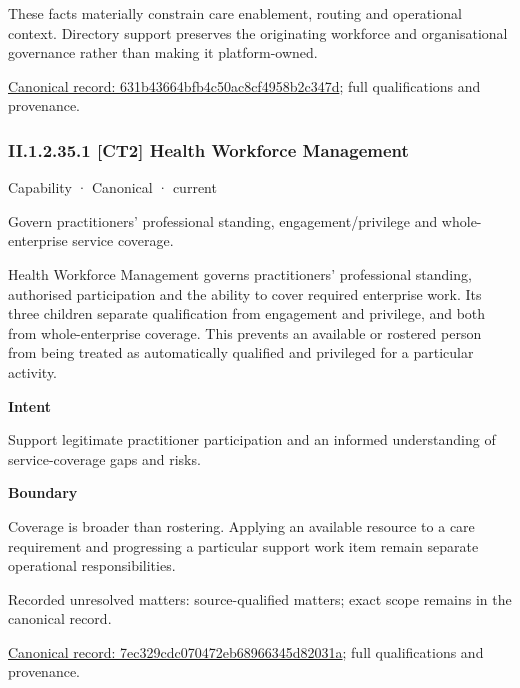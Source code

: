 These facts materially constrain care enablement, routing and operational context. Directory support preserves the originating workforce and organisational governance rather than making it platform-owned.


{\footnotesize \href{../../../../continuum/strategy/capability/631b43664bfb4c50ac8cf4958b2c347d.md}{Canonical record: 631b43664bfb4c50ac8cf4958b2c347d}; full qualifications and provenance.}\par
\subsubsection*{II.1.2.35.1 [CT2] Health Workforce Management}
\label{navigation:II.1.2.35.1}

\label{element:7ec329cdc070472eb68966345d82031a}
{\small Capability · Canonical · current}\par

Govern practitioners’ professional standing, engagement/privilege and whole-enterprise service coverage.



Health Workforce Management governs practitioners' professional standing, authorised participation and the ability to cover required enterprise work. Its three children separate qualification from engagement and privilege, and both from whole-enterprise coverage. This prevents an available or rostered person from being treated as automatically qualified and privileged for a particular activity.



\textbf{Intent}



Support legitimate practitioner participation and an informed understanding of service-coverage gaps and risks.



\textbf{Boundary}



Coverage is broader than rostering. Applying an available resource to a care requirement and progressing a particular support work item remain separate operational responsibilities.


{\small Recorded unresolved matters: source-qualified matters; exact scope remains in the canonical record.}\par
{\footnotesize \href{../../../../continuum/strategy/capability/7ec329cdc070472eb68966345d82031a.md}{Canonical record: 7ec329cdc070472eb68966345d82031a}; full qualifications and provenance.}\par
